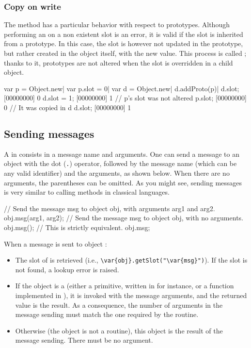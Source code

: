 \subsubsection{Copy on write}

The  method has a particular behavior with
respect to prototypes. Although performing an 
on a non existent slot is an error, it is valid if the slot is inherited
from a prototype. In this case, the slot is however not updated in the
prototype, but rather created in the object itself, with the new value. This
process is called ; thanks to it, prototypes are not
altered when the slot is overridden in a child object.

\begin{urbiscript}
var p = Object.new|
var p.slot = 0|
var d = Object.new|
d.addProto(p)|
d.slot;
[00000000] 0
d.slot = 1;
[00000000] 1
// p's slot was not altered
p.slot;
[00000000] 0
// It was copied in d
d.slot;
[00000000] 1
\end{urbiscript}

\subsection{Sending messages}

A  in \us consists in a message name and arguments. One can
send a message to an object with the dot (\lstinline|.|) operator, followed
by the message name (which can be any valid identifier) and the arguments,
as shown below. When there are no arguments, the parentheses can be
omitted. As you might see, sending messages is very similar to calling
methods in classical languages.

\begin{urbiunchecked}
// Send the message msg to object obj, with arguments arg1 and arg2.
obj.msg(arg1, arg2);
// Send the message msg to object obj, with no arguments.
obj.msg();
// This is strictly equivalent.
obj.msg;
\end{urbiunchecked}

When a message  is sent to object :

\begin{itemize}
\item The  slot of  is retrieved (i.e.,
  \lstinline[style=varInString]|\var{obj}.getSlot("\var{msg}")|). If the
  slot is not found, a lookup error is raised.
\item If the object is a  (either a primitive, written in \Cxx
  for instance, or a function implemented in \us), it is invoked with the
  message arguments, and the returned value is the result. As a consequence,
  the number of arguments in the message sending must match the one required
  by the routine.
\item Otherwise (the object is not a routine), this object is the result of
  the message sending. There must be no argument.
\end{itemize}

